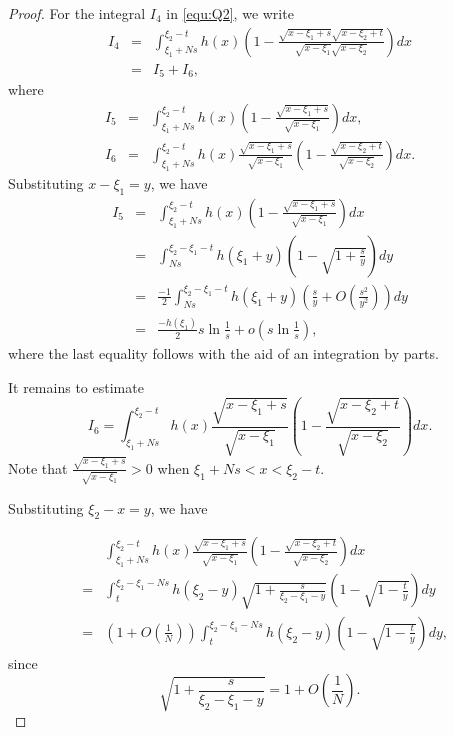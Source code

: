 \documentclass[10pt,a4paper]{amsart}
\begin{document}
\begin{proof}
For the integral $I_4$ in \eqref{equ:Q2}, we write
\begin{eqnarray*}
   I_4 &=& \int_{\xi_1+Ns}^{\xi_2-t} h(x)\left(1-\frac{\sqrt{x-\xi_1+s}\sqrt{x-\xi_2+t}}{\sqrt{x-\xi_1}\sqrt{x-\xi_2}}\right)dx \\
    &=& I_5+I_6, 
    \end{eqnarray*}
    where
  \begin{eqnarray*} 
  I_5 &=& \int_{\xi_1+Ns}^{\xi_2-t}h(x)\left(1-\frac{\sqrt{x-\xi_1+s}}{\sqrt{x-\xi_1}}\right)dx, \\
  I_6 &=& \int_{\xi_1+Ns}^{\xi_2-t}  h(x) \frac{\sqrt{x-\xi_1+s}}{\sqrt{x-\xi_1}} \left(1-\frac{\sqrt{x-\xi_2+t}}{\sqrt{x-\xi_2}}\right)dx.
\end{eqnarray*}
Substituting $x-\xi_1=y$, we have 
\begin{eqnarray*}
I_5 &=& \int_{\xi_1+Ns}^{\xi_2-t}h(x) \left(1-\frac{\sqrt{x-\xi_1+s}}{\sqrt{x-\xi_1}}\right)dx \\
&=& \int_{Ns}^{\xi_2-\xi_1-t} h(\xi_1+y) \left(1-\sqrt{1+\frac{s}{y}}\right) dy\\
&=& \frac{-1}{2} \int_{Ns}^{\xi_2-\xi_1-t} h(\xi_1+y) \left( \frac{s}{y}  +O\left(\frac{s^2}{y^2}\right)\right) dy\\
&=& \frac{-h(\xi_1)}{2}s\ln \frac{1}{s}+o\left(s\ln \frac{1}{s}\right),
\end{eqnarray*}
where the last equality follows with the aid of an integration by parts.


It remains to estimate 
$$I_6=\int_{\xi_1+Ns}^{\xi_2-t}  h(x) \frac{\sqrt{x-\xi_1+s}}{\sqrt{x-\xi_1}} \left(1-\frac{\sqrt{x-\xi_2+t}}{\sqrt{x-\xi_2}}\right)dx.$$
Note that  $\frac{\sqrt{x-\xi_1+s}}{\sqrt{x-\xi_1}}>0$
when  $\xi_1+Ns<x<\xi_2-t$.


Substituting $\xi_2-x=y$, we have 

\begin{eqnarray*}
&& \int_{\xi_1+Ns}^{\xi_2-t}  h(x) \frac{\sqrt{x-\xi_1+s}}{\sqrt{x-\xi_1}} \left(1-\frac{\sqrt{x-\xi_2+t}}{\sqrt{x-\xi_2}}\right)dx \\
&=&  \int_{t}^{\xi_2-\xi_1-Ns}  h(\xi_2-y) \sqrt{1+\frac{s}{\xi_2-\xi_1-y}}
 \left(1- \sqrt{1- \frac{t}{y}}\right)dy \\
 &=& \left( 1+ O\left(\frac{1}{N}\right)\right) \int_{t}^{\xi_2-\xi_1-Ns}  h(\xi_2-y)
 \left(1- \sqrt{1- \frac{t}{y}}\right)dy, 
\end{eqnarray*}
since
$$\sqrt{1+\frac{s}{\xi_2-\xi_1-y}}=1+ O\left(\frac{1}{N}\right).$$


\end{proof}
\end{document}
